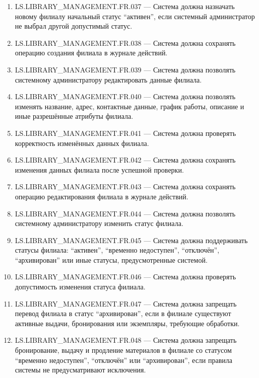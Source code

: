 \documentclass[12pt,a4paper]{article}
\begin{document}
\begin{enumerate}
		\item LS.LIBRARY\_MANAGEMENT.FR.037 --- Система должна назначать новому филиалу
		начальный статус ``активен'', если системный администратор не выбрал другой
		допустимый статус.
		
		\item LS.LIBRARY\_MANAGEMENT.FR.038 --- Система должна сохранять операцию
		создания филиала в журнале действий.
		
		\item LS.LIBRARY\_MANAGEMENT.FR.039 --- Система должна позволять системному
		администратору редактировать данные филиала.
		
		\item LS.LIBRARY\_MANAGEMENT.FR.040 --- Система должна позволять изменять название,
		адрес, контактные данные, график работы, описание и иные разрешённые атрибуты
		филиала.
		
		\item LS.LIBRARY\_MANAGEMENT.FR.041 --- Система должна проверять корректность
		изменённых данных филиала.
		
		\item LS.LIBRARY\_MANAGEMENT.FR.042 --- Система должна сохранять изменения
		данных филиала после успешной проверки.
		
		\item LS.LIBRARY\_MANAGEMENT.FR.043 --- Система должна сохранять операцию
		редактирования филиала в журнале действий.
		
		\item LS.LIBRARY\_MANAGEMENT.FR.044 --- Система должна позволять системному
		администратору изменить статус филиала.
		
		\item LS.LIBRARY\_MANAGEMENT.FR.045 --- Система должна поддерживать статусы
		филиала: ``активен'', ``временно недоступен'', ``отключён'', ``архивирован''
		или иные статусы, предусмотренные системой.
		
		\item LS.LIBRARY\_MANAGEMENT.FR.046 --- Система должна проверять допустимость
		изменения статуса филиала.
		
		\item LS.LIBRARY\_MANAGEMENT.FR.047 --- Система должна запрещать перевод филиала
		в статус ``архивирован'', если в филиале существуют активные выдачи, бронирования
		или экземпляры, требующие обработки.
		
		\item LS.LIBRARY\_MANAGEMENT.FR.048 --- Система должна запрещать бронирование,
		выдачу и продление материалов в филиале со статусом ``временно недоступен'',
		``отключён'' или ``архивирован'', если правила системы не предусматривают
		исключения.
		

\end{enumerate}
\end{document}
